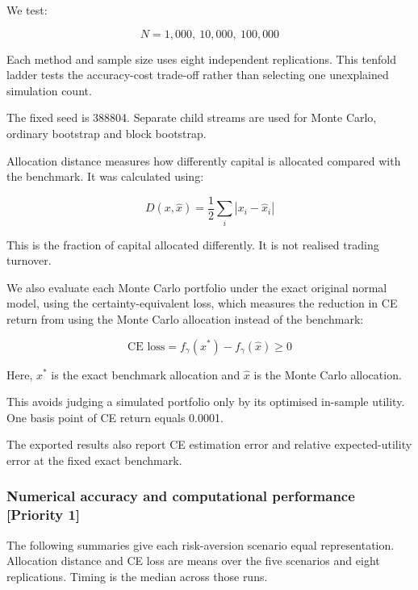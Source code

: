 \documentclass[
  10pt,
  a4paper,
]{article}
\begin{document}
We test:

\[
N=1{,}000,\ 10{,}000,\ 100{,}000
\]

Each method and sample size uses eight independent replications. This
tenfold ladder tests the accuracy-cost trade-off rather than selecting
one unexplained simulation count.

The fixed seed is 388804. Separate child streams are used for Monte
Carlo, ordinary bootstrap and block bootstrap.

Allocation distance measures how differently capital is allocated
compared with the benchmark. It was calculated using:

\[
D(x,\hat x)=\frac12\sum_i|x_i-\hat x_i|
\]

This is the fraction of capital allocated differently. It is not
realised trading turnover.

We also evaluate each Monte Carlo portfolio under the exact original
normal model, using the certainty-equivalent loss, which measures the
reduction in CE return from using the Monte Carlo allocation instead of
the benchmark:

\[
\text{CE loss}=f_\gamma(x^*)-f_\gamma(\hat x)\ge0
\]

Here, \(x^*\) is the exact benchmark allocation and \(\hat x\) is the
Monte Carlo allocation.

This avoids judging a simulated portfolio only by its optimised
in-sample utility. One basis point of CE return equals 0.0001.

The exported results also report CE estimation error and relative
expected-utility error at the fixed exact benchmark.

\hypertarget{numerical-accuracy-and-computational-performance-priority-1}{%
\subsubsection{Numerical accuracy and computational performance
{[}Priority
1{]}}\label{numerical-accuracy-and-computational-performance-priority-1}}

The following summaries give each risk-aversion scenario equal
representation. Allocation distance and CE loss are means over the five
scenarios and eight replications. Timing is the median across those
runs.
\end{document}
